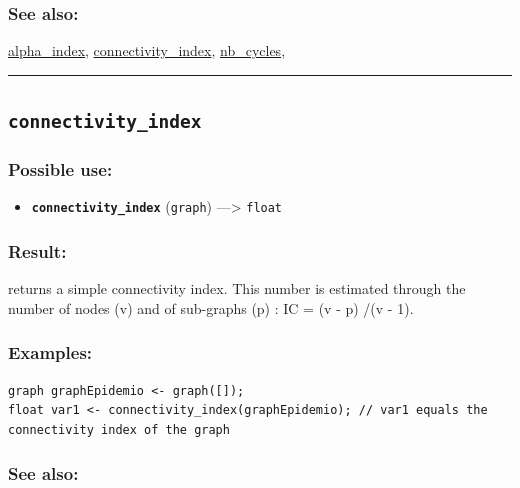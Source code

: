 \documentclass[]{book}
\providecommand{\tightlist}{%
  \setlength{\itemsep}{0pt}\setlength{\parskip}{0pt}}
\theoremstyle{definition}
\theoremstyle{definition}
\theoremstyle{definition}
\theoremstyle{remark}
\begin{document}
\subsubsection{See also:}\label{see-also-60}

\href{operators-a-to-a.html\#alpha_index}{alpha\_index},
\href{operators-b-to-c.html\#connectivity_index}{connectivity\_index},
\href{operators-n-to-r.html\#nb_cycles}{nb\_cycles},

\begin{center}\rule{0.5\linewidth}{\linethickness}\end{center}

\subsection{\texorpdfstring{\texttt{connectivity\_index}}{connectivity\_index}}\label{connectivity_index}

\subsubsection{Possible use:}\label{possible-use-97}

\begin{itemize}
\tightlist
\item
  \textbf{\texttt{connectivity\_index}} (\texttt{graph})
  ---\textgreater{} \texttt{float}
\end{itemize}

\subsubsection{Result:}\label{result-95}

returns a simple connectivity index. This number is estimated through
the number of nodes (v) and of sub-graphs (p) : IC = (v - p) /(v - 1).

\subsubsection{Examples:}\label{examples-75}

\begin{verbatim}
graph graphEpidemio <- graph([]);  
float var1 <- connectivity_index(graphEpidemio); // var1 equals the connectivity index of the graph
\end{verbatim}

\subsubsection{See also:}\label{see-also-61}
\end{document}
